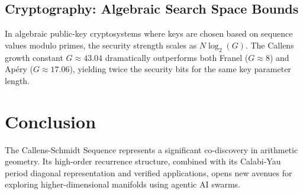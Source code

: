 \documentclass[12pt,reqno]{amsart}
\theoremstyle{plain}
\theoremstyle{definition}
\begin{document}
\subsection{Cryptography: Algebraic Search Space Bounds}
In algebraic public-key cryptosystems where keys are chosen based on sequence values modulo primes, the security strength scales as $N \log_2(G)$. The Callens growth constant $G \approx 43.04$ dramatically outperforms both Franel ($G \approx 8$) and Ap\'{e}ry ($G \approx 17.06$), yielding twice the security bits for the same key parameter length.

\section{Conclusion}
The Callens-Schmidt Sequence represents a significant co-discovery in arithmetic geometry. Its high-order recurrence structure, combined with its Calabi-Yau period diagonal representation and verified applications, opens new avenues for exploring higher-dimensional manifolds using agentic AI swarms.
\end{document}
